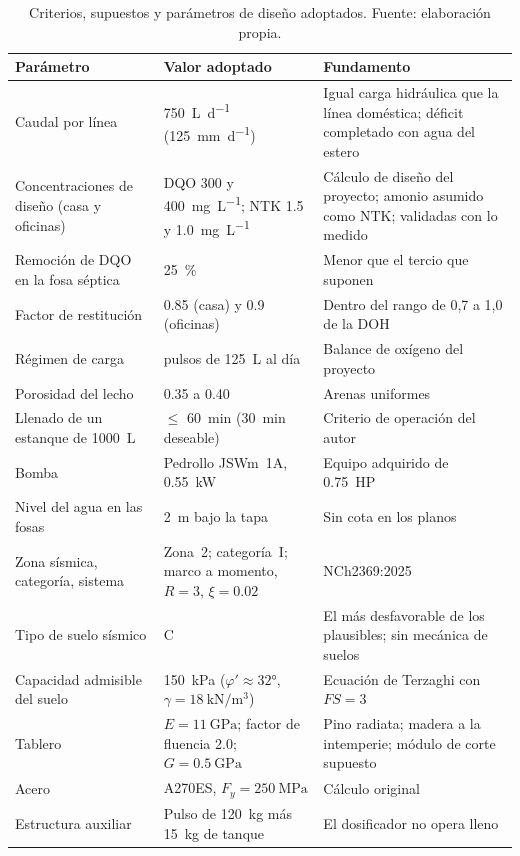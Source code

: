 \begin{table}[htbp]
  \centering
  \caption{Criterios, supuestos y parámetros de diseño adoptados. Fuente: elaboración propia.}
  \label{tab:supuestos}
  \small
  \begin{tabular}{@{}>{\raggedright\arraybackslash}p{4.4cm}>{\raggedright\arraybackslash}p{4.2cm}>{\raggedright\arraybackslash}p{5.6cm}@{}}
    \toprule
    Parámetro & Valor adoptado & Fundamento \\
    \midrule
    Caudal por línea & \qty{750}{\liter\per\day} (\qty{125}{\milli\meter\per\day}) & Igual carga hidráulica que la línea doméstica; déficit completado con agua del estero \\
    Concentraciones de diseño (casa y oficinas) & DQO 300 y \qty{400}{\milli\gram\per\liter}; NTK \num{1.5} y \qty{1.0}{\milli\gram\per\liter} & Cálculo de diseño del proyecto; amonio asumido como NTK; validadas con lo medido \\
    Remoción de DQO en la fosa séptica & \qty{25}{\percent} & Menor que el tercio que suponen \textcite{dotro2021humedales} \\
    Factor de restitución & \num{0.85} (casa) y \num{0.9} (oficinas) & Dentro del rango de 0,7 a 1,0 de la DOH \\
    Régimen de carga & 6 pulsos de \qty{125}{\liter} al día & Balance de oxígeno del proyecto \\
    Porosidad del lecho & \num{0.35} a \num{0.40} & Arenas uniformes \parencite{das2015fundamentos} \\
    Llenado de un estanque de \qty{1000}{\liter} & $\leq$ \qty{60}{\minute} (\qty{30}{\minute} deseable) & Criterio de operación del autor \\
    Bomba & Pedrollo JSWm~1A, \qty{0.55}{\kilo\watt} & Equipo adquirido de \qty{0.75}{HP} \\
    Nivel del agua en las fosas & \qty{2}{\meter} bajo la tapa & Sin cota en los planos \\
    Zona sísmica, categoría, sistema & Zona~2; categoría~I; marco a momento, $R = 3$, $\xi = \num{0.02}$ & NCh2369:2025 \\
    Tipo de suelo sísmico & C & El más desfavorable de los plausibles; sin mecánica de suelos \\
    Capacidad admisible del suelo & \qty{150}{\kilo\pascal} ($\varphi' \approx \ang{32}$, $\gamma = \qty{18}{\kilo\newton\per\cubic\meter}$) & Ecuación de Terzaghi con $FS = 3$ \parencite{das2015fundamentos} \\
    Tablero & $E = \qty{11}{\giga\pascal}$; factor de fluencia \num{2.0}; $G = \qty{0.5}{\giga\pascal}$ & Pino radiata; madera a la intemperie; módulo de corte supuesto \\
    Acero & A270ES, $F_y = \qty{250}{\mega\pascal}$ & Cálculo original \\
    Estructura auxiliar & Pulso de \qty{120}{\kilo\gram} más \qty{15}{\kilo\gram} de tanque & El dosificador no opera lleno \\
    \bottomrule
  \end{tabular}
\end{table}

